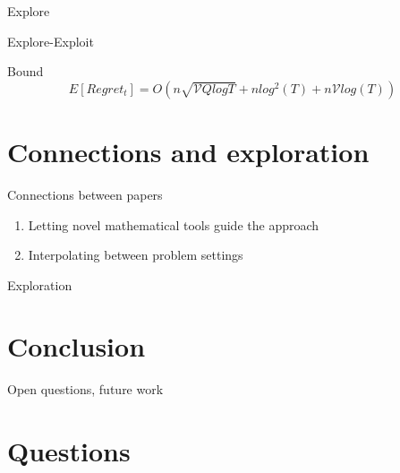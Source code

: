 \documentclass{beamer}
\begin{document}
\begin{frame}{Explore}
  
\end{frame}
\begin{frame}{Explore-Exploit}
  
\end{frame}


\begin{frame}{Bound}
  \begin{equation}
    E[Regret_t] = O(n \sqrt{\mathcal{V}Q log T} + n log^2(T) + n \mathcal{V}log(T))
  \end{equation}
\end{frame}

\section{Connections and exploration}
\begin{frame}{Connections between papers}
  \begin{enumerate}
  \item
    Letting novel mathematical tools guide the approach
  \item 
    Interpolating between problem settings
  \end{enumerate}
\end{frame}

\begin{frame}{Exploration}
\end{frame}

\section{Conclusion}
\begin{frame}{Open questions, future work}
\end{frame}

\section{Questions}
\end{document}
